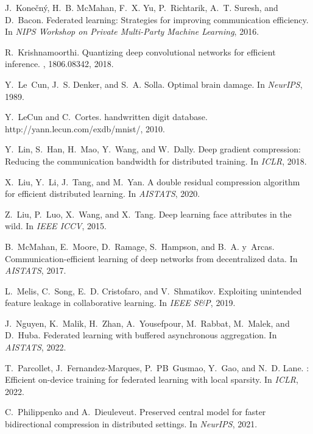 \documentclass[11pt]{article}
\begin{document}
\begin{thebibliography}{10}
\begin{small}
J.~Konečný, H.~B. McMahan, F.~X. Yu, P.~Richtarik, A.~T. Suresh, and
  D.~Bacon.
\newblock Federated learning: Strategies for improving communication
  efficiency.
\newblock In {\em NIPS Workshop on Private Multi-Party Machine Learning}, 2016.

R.~Krishnamoorthi.
\newblock Quantizing deep convolutional networks for efficient inference.
, 1806.08342, 2018.

Y.~Le~Cun, J.~S. Denker, and S.~A. Solla.
\newblock Optimal brain damage.
\newblock In {\em NeurIPS}, 1989.

Y.~LeCun and C.~Cortes.
 handwritten digit database.
\newblock http://yann.lecun.com/exdb/mnist/, 2010.

Y.~Lin, S.~Han, H.~Mao, Y.~Wang, and W.~Dally.
\newblock Deep gradient compression: Reducing the communication bandwidth for
  distributed training.
\newblock In {\em ICLR}, 2018.

X.~Liu, Y.~Li, J.~Tang, and M.~Yan.
\newblock A double residual compression algorithm for efficient distributed
  learning.
\newblock In {\em AISTATS}, 2020.

Z.~Liu, P.~Luo, X.~Wang, and X.~Tang.
\newblock Deep learning face attributes in the wild.
\newblock In {\em {IEEE} ICCV}, 2015.

B.~McMahan, E.~Moore, D.~Ramage, S.~Hampson, and B.~A. y~Arcas.
\newblock Communication-efficient learning of deep networks from decentralized
  data.
\newblock In {\em AISTATS}, 2017.

L.~Melis, C.~Song, E.~D. Cristofaro, and V.~Shmatikov.
\newblock Exploiting unintended feature leakage in collaborative learning.
\newblock In {\em {IEEE} S\&P}, 2019.

J.~Nguyen, K.~Malik, H.~Zhan, A.~Yousefpour, M.~Rabbat, M.~Malek, and D.~Huba.
\newblock Federated learning with buffered asynchronous aggregation.
\newblock In {\em AISTATS}, 2022.

T.~Parcollet, J.~Fernandez-Marques, P.~PB~Gusmao, Y.~Gao, and N.~D. Lane.
: Efficient on-device training for federated learning with
  local sparsity.
\newblock In {\em ICLR}, 2022.

C.~Philippenko and A.~Dieuleveut.
\newblock Preserved central model for faster bidirectional compression in
  distributed settings.
\newblock In {\em NeurIPS}, 2021.


\end{small}
\end{thebibliography}
\end{document}
